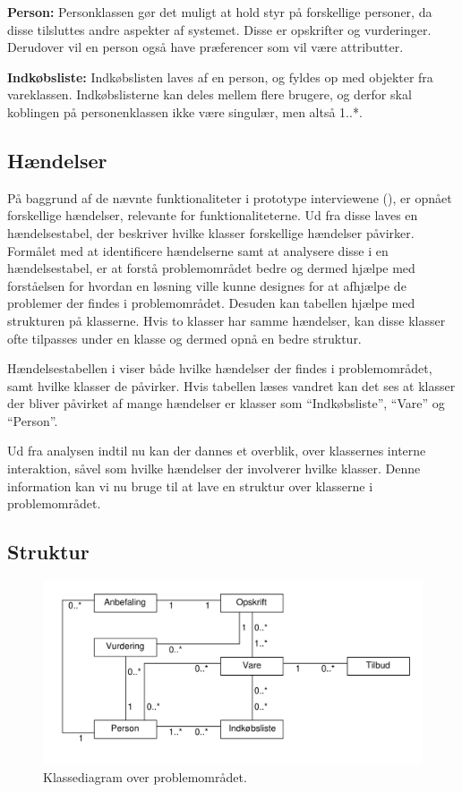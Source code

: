 \textbf{Person:}
Personklassen gør det muligt at hold styr på forskellige personer, da disse tilsluttes andre aspekter af systemet.
Disse er opskrifter og vurderinger.
Derudover vil en person også have præferencer som vil være attributter.

\textbf{Indkøbsliste:}
Indkøbslisten laves af en person, og fyldes op med objekter fra vareklassen.
Indkøbslisterne kan deles mellem flere brugere, og derfor skal koblingen på personenklassen ikke være singulær, men altså 1..*.

\subsection{Hændelser}\label{handelser}
På baggrund af de nævnte funktionaliteter i prototype interviewene (), er opnået forskellige hændelser, relevante for funktionaliteterne.
Ud fra disse laves en hændelsestabel, der beskriver hvilke klasser forskellige hændelser påvirker.
Formålet med at identificere hændelserne samt at analysere disse i en hændelsestabel, er at forstå problemområdet bedre og dermed hjælpe med forståelsen for hvordan en løsning ville kunne designes for at afhjælpe de problemer der findes i problemområdet. Desuden kan tabellen hjælpe med strukturen på klasserne.
Hvis to klasser har samme hændelser, kan disse klasser ofte tilpasses under en klasse og dermed opnå en bedre struktur.



Hændelsestabellen i  viser både hvilke hændelser der findes i problemområdet, samt hvilke klasser de påvirker.
Hvis tabellen læses vandret kan det ses at klasser der bliver påvirket af mange hændelser er klasser som ``Indkøbsliste'', ``Vare'' og ``Person''.

Ud fra analysen indtil nu kan der dannes et overblik, over klassernes interne interaktion, såvel som hvilke hændelser der involverer hvilke klasser.
Denne information kan vi nu bruge til at lave en struktur over klasserne i problemområdet.

\subsection{Struktur}\label{sec:struktur}
\begin{figure}
	\centering
		\includegraphics[scale=0.6]{images/Diagrams/klassediagram_model_simple.pdf}
	\caption{Klassediagram over problemområdet.}
	\label{figur:PDklasse}
\end{figure}

